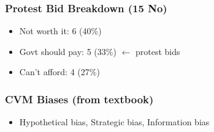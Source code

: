 \documentclass[11pt, a4paper]{article}
\begin{document}
\begin{minipage}[t]{0.48\textwidth}
\subsubsection*{\color{navy}Protest Bid Breakdown (15 No)}
\begin{itemize}[nosep, leftmargin=*]
\item Not worth it: 6 (40\%)
\item Govt should pay: 5 (33\%) $\leftarrow$ protest bids
\item Can't afford: 4 (27\%)
\end{itemize}

\subsubsection*{\color{navy}CVM Biases (from textbook)}
\begin{itemize}[nosep, leftmargin=*]
\item Hypothetical bias, Strategic bias, Information bias
\end{itemize}
\end{minipage}
\end{document}
